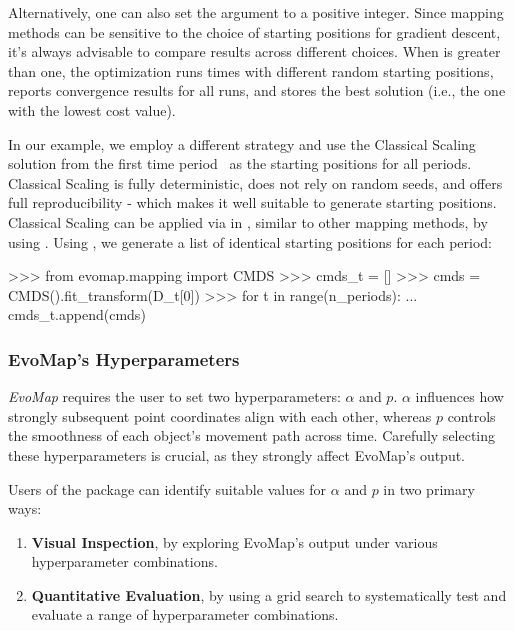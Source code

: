 \documentclass[article]{jss}
\begin{document}
Alternatively, one can also set the  argument to a positive integer. Since mapping methods 
can be sensitive to the choice of starting positions for gradient descent, it's always advisable to compare results
across different choices. When  is greater than one, the optimization runs  times with 
different random starting positions, reports convergence results for all runs, and stores the best solution 
(i.e., the one with the lowest cost value).

In our example, we employ a different strategy and use the Classical Scaling solution from the first time period \
as the starting positions for all periods. Classical Scaling is fully deterministic, does not rely on random seeds, 
and offers full reproducibility - which makes it well suitable to generate starting positions. 
Classical Scaling can be applied via  in \code{evomap.mapping}, similar to other 
mapping methods, by using \code{fit\_transform()}. Using \code{CMDS}, we generate a list of identical starting positions 
for each period:

\begin{CodeChunk}
\begin{CodeInput}
>>> from evomap.mapping import CMDS
>>> cmds_t = []
>>> cmds = CMDS().fit_transform(D_t[0])
>>> for t in range(n_periods):
...     cmds_t.append(cmds)
\end{CodeInput}
\end{CodeChunk}

\subsubsection{EvoMap's Hyperparameters}

\emph{EvoMap} requires the user to set two hyperparameters: $\alpha$ and $p$. 
$\alpha$ influences how strongly subsequent point coordinates align with each other, 
whereas $p$ controls the smoothness of each object's movement path across time. Carefully selecting
these hyperparameters is crucial, as they strongly affect EvoMap's output. 

Users of the  package can identify suitable values for $\alpha$ and $p$ in two primary ways: 

\begin{enumerate}
  \item \textbf{Visual Inspection}, by exploring EvoMap's output under various hyperparameter combinations. 
  \item \textbf{Quantitative Evaluation}, by using a grid search to systematically test and evaluate a range of %
  hyperparameter combinations.
\end{enumerate}
\end{document}
